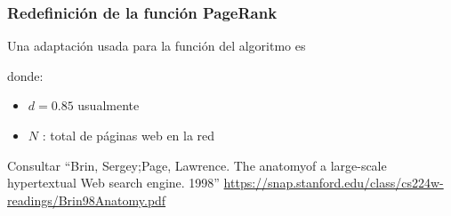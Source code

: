 \documentclass[
10pt, %
aspectratio=169, %
]{beamer}
\begin{document}
	\begin{frame}
		
		\frametitle{Redefinición de la función PageRank}
		
		Una adaptación usada para la función del algoritmo es 
		
		
		
		
		donde:
		\begin{itemize}
			\item $d=0.85$ usualmente
			\item $N$ : total de páginas web en la red 
		\end{itemize}	

		\centering
		\vspace{1.5\baselineskip}
		{\scriptsize Consultar ``Brin, Sergey;Page, Lawrence. The anatomyof a large-scale hypertextual Web search engine. 1998'' \url{https://snap.stanford.edu/class/cs224w-readings/Brin98Anatomy.pdf}}

	\end{frame}
	
\end{document}
